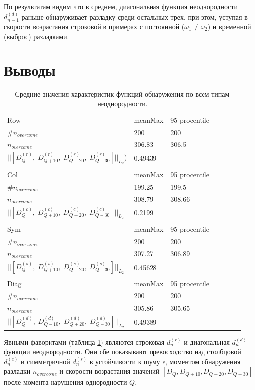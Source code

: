 \documentclass[specialist, substylefile = spbu.rtx,
			   subf, href, 12pt]{disser}
\begin{document}
По результатам видим что в среднем, диагональная функция неоднородности $d_{n-1}^{(d)}$ раньше обнаруживает разладку среди остальных трех, при этом, уступая в скорости возрастания строковой в примерах с постоянной ($\omega_1 \neq \omega_2$) и временной (выброс) разладками. 

\newpage
\section{Выводы}

\begin{table}[!hhh]
	\center
	\caption{Средние значения характеристик функций обнаружения по всем типам неоднородности.}
	\begin{tabular}{lllllll}
		Row & meanMax & 95 procentile \\
		$\#n_{overcome}$ & 200 & 200 \\
		$n_{overcome}$ & 306.83 & 306.5 \\
		$||[D_Q^{(r)},\; D_{Q+10}^{(r)},\; D_{Q+20}^{(r)},\; D_{Q+30}^{(r)}]||_{L_2})$ & 0.49439 &  \\
		&  &  \\
		Col & meanMax & 95 procentile \\
		$\#n_{overcome}$ & 199.25 & 199.5 \\
		$n_{overcome}$ & 308.79 & 308.66 \\
		$||[D_Q^{(c)},\; D_{Q+10}^{(c)},\; D_{Q+20}^{(c)},\; D_{Q+30}^{(c)}]||_{L_2}$ & 0.2199 & \\
		&  &  \\
		Sym & meanMax & 95 procentile \\
		$\#n_{overcome}$ & 200 & 200 \\
		$n_{overcome}$ & 307.27 & 306.89 \\
		$||[D_Q^{(s)},\; D_{Q+10}^{(s)},\; D_{Q+20}^{(s)},\; D_{Q+30}^{(s)}]||_{L_2}$ & 0.45628 & \\
		&  &  \\
		Diag & meanMax & 95 procentile \\
		$\#n_{overcome}$ & 200 & 200 \\
		$n_{overcome}$ & 305.86 & 305.65 \\
		$||[D_Q^{(d)},\; D_{Q+10}^{(d)},\; D_{Q+20}^{(d)},\; D_{Q+30}^{(d)}]||_{L_2}$ & 0.49389 & 
	\end{tabular}
	\label{tab:AvgResultsNoise}
\end{table}

Явными фаворитами (таблица \ref{tab:AvgResultsNoise}) являются строковая $d_{n}^{(r)}$ и диагональная $d_{n}^{(d)}$ функции неоднородности. Они обе показывают превосходство над столбцовой $d_{n}^{(c)}$ и симметричной $d_{n}^{(s)}$ в устойчивости к шуму $\epsilon$, моментом обнаружения разладки $n_{overcome}$ и скорости возрастания значений $[D_Q, D_{Q+10}, D_{Q+20}, D_{Q+30}]$ после момента нарушения однородности $Q$.
\end{document}

